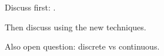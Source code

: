 Discuss first: \cite{hempel_scopes17}.

Then discuss using the new techniques.

Also open question: discrete vs continuous.